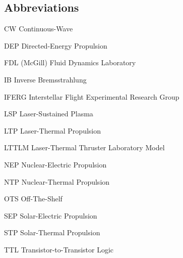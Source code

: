 \begin{multicols}{2}
    \section*{Abbreviations}

    \begin{nomlist}
        \item[CW]               Continuous-Wave
        \item[DEP]              Directed-Energy Propulsion
        \item[FDL]              (McGill) Fluid Dynamics Laboratory
        \item[IB]               Inverse Bremsstrahlung 
        \item[IFERG]            Interstellar Flight Experimental Research Group
        \item[LSP]              Laser-Sustained Plasma
        \item[LTP]              Laser-Thermal Propulsion
        \item[LTTLM]            Laser-Thermal Thruster Laboratory Model
        \item[NEP]              Nuclear-Electric Propulsion
        \item[NTP]              Nuclear-Thermal Propulsion 
        \item[OTS]              Off-The-Shelf
        \item[SEP]              Solar-Electric Propulsion
        \item[STP]              Solar-Thermal Propulsion
        \item[TTL]              Transistor-to-Transistor Logic
    \end{nomlist}

    


\end{multicols}
